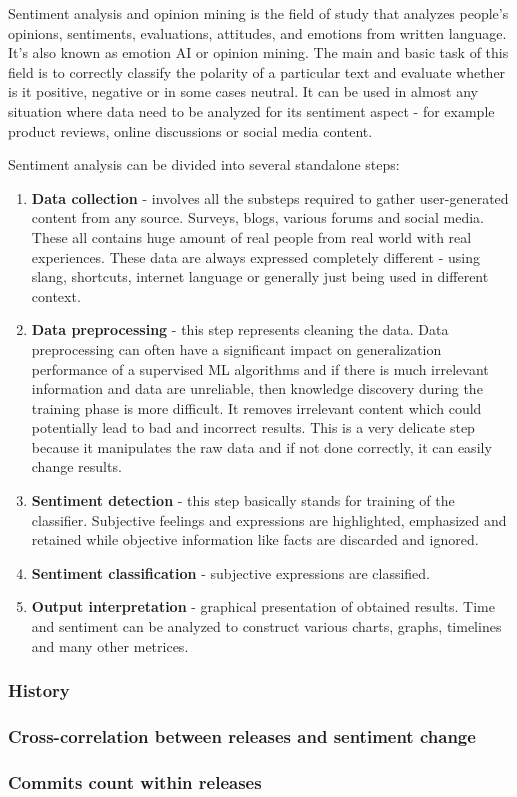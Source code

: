 Sentiment analysis and opinion mining is the field of study that analyzes people's opinions, sentiments, evaluations, attitudes, and emotions from written language.\cite{liu2012sentiment} It's also known as emotion AI or opinion mining. The main and basic task of this field is to correctly classify the polarity of a particular text and evaluate whether is it positive, negative or in some cases neutral. It can be used in almost any situation where data need to be analyzed for its sentiment aspect - for example product reviews, online discussions or social media content.

Sentiment analysis can be divided into several standalone steps:
\begin{enumerate}
  \item \textbf{Data collection} - involves all the substeps required to gather user-generated content from any source. Surveys, blogs, various forums and social media. These all contains huge amount of real people from real world with real experiences. These data are always expressed completely different - using slang, shortcuts, internet language or generally just being used in different context.
  \item \textbf{Data preprocessing} - this step represents cleaning the data. Data preprocessing can often have a significant impact on generalization performance of a supervised ML algorithms \cite{kotsiantis2006data} and if there is much irrelevant information and data are unreliable, then knowledge discovery during the training phase is more difficult. It removes irrelevant content which could potentially lead to bad and incorrect results. This is a very delicate step because it manipulates the raw data and if not done correctly, it can easily change results.
  \item \textbf{Sentiment detection} - this step basically stands for training of the classifier. Subjective feelings and expressions are highlighted, emphasized and retained while objective information like facts are discarded and ignored. 
  \item \textbf{Sentiment classification} - subjective expressions are classified.
    \item \textbf{Output interpretation} - graphical presentation of obtained results. Time and sentiment can be analyzed to construct various charts, graphs, timelines and many other metrices.
\end{enumerate}

\subsubsection{History}


\subsubsection{Cross-correlation between releases and sentiment change}


\subsubsection{Commits count within releases}

